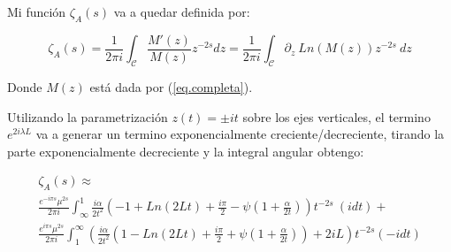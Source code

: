 Mi función $ \zeta _A (s) $ va a quedar definida por:

\begin{equation}
\zeta _A (s) = 
\frac{1}{2 \pi i} 
\int _{\mathcal{C}}
\frac{M ' ( z ) }{ M ( z ) } z ^{-2s} d z = 
\frac{1}{2 \pi i} 
\int _{\mathcal{C}}
\partial _z \ Ln (	M(z) ) z ^{-2s} \ dz
\label{eq.zeta.compleja}
\end{equation}

Donde $M ( z )$ está dada por (\ref{eq.completa}).

Utilizando la parametrización $ z (t) = \pm i t$ sobre los ejes verticales, el termino $e ^{2 i \lambda L}$ va a generar un termino exponencialmente creciente/decreciente, tirando la parte exponencialmente decreciente y la integral angular obtengo:

\begin{comment}

\begin{equation}
\begin{array}{c}
    \zeta _A (s) = \\
     \frac{1}{2 \pi i} \int _{\infty} ^{1}
     \frac{ i \alpha }{2 t^2} 
     \left(
      1 + \frac{i \pi}{2} + Ln[2 t] + \psi (1 + \frac{\beta}{2 t})
     \right)
     t ^{-2s}
     e ^{- i \pi s} (i dt) + \\
     \frac{1}{2 \pi i} \int _{\infty} ^{1} 
     \left(
     2 + \frac{\beta}{2 t^2}
     \left(
     1 + \frac{i \pi}{2} - Ln[2 t] - \psi (1+ \frac{\beta}{2 t})
     \right)
     t ^{-2s}
     e ^{ i \pi s} (-i dt)
     \right)     
\end{array}
\end{equation}

\end{comment}

\begin{equation}
\begin{array}{c}
    \zeta _A (s) \approx \\
     \frac{e^{-i \pi s} \mu ^{2s}}{2 \pi i} \int _{\infty} ^{1}
     \frac{ i \alpha}{2 t^2}
     \left(
     - 1 + Ln(2 L t) + \frac{i \pi}{2}  - \psi (1+\frac{\alpha}{2 t})
     \right)
     t^{-2 s}
      \ 
     (i dt) + \\
     \frac{e^{i \pi s} \mu ^{2s}}{2 \pi i} \int _1 ^{\infty}
	\left(      
     \frac{ i \alpha}{2  t^2}
     \left(
     1 - Ln(2 L t) + \frac{i \pi}{2} + \psi (1 + \frac{\alpha}{2 t}) 
      
     \right)
     + 2 i L
     \right)
     t^{-2 s}
     (-i dt)
     
\end{array}
\end{equation}

